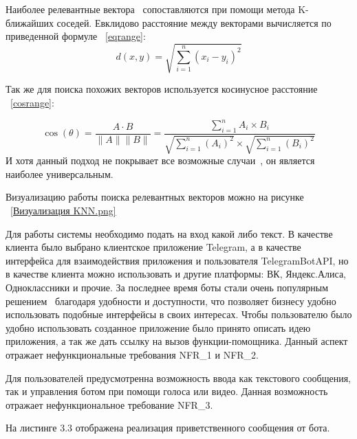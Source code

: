 
Наиболее релевантные вектора~\cite{vec} сопоставляются при помощи метода K-ближайших 
соседей. Евклидово расстояние между векторами вычисляется по приведенной формуле
~\ref{eqrange}:\\
\begin{equation} \label{eqrange}
    d(x,y)=\sqrt{\sum_{i=1}^{n}{(x_i-y_i)}^2}
\end{equation}

Так же для поиска похожих векторов используется косинусное расстояние
~\ref{cosrange}:

\begin{equation} \label{cosrange}
    \cos(\theta) = \frac{A \cdot B}{\| A\| \|B\|} = 
    \frac{\sum_{i=1}^{n}A_i \times B_i}{\sqrt{\sum_{i=1}^{n}(A_i)^2}
    \times \sqrt{\sum_{i=1}^{n}(B_i)^2}}
\end{equation}
И хотя данный подход не покрывает все возможные случаи~\cite{leven}, он
является наиболее универсальным.

Визуализацию работы поиска релевантных векторов можно на рисунке
~\ref{Визуализация KNN.png}


Для работы системы необходимо подать на вход какой либо текст.
В качестве клиента было выбрано клиентское приложение Telegram, а в качестве
интерфейса для взаимодействия приложения и пользователя TelegramBotAPI, но
в качестве клиента можно использовать и другие платформы: ВК, Яндекс.Алиса,
Одноклассники и прочие. За последнее время боты стали очень популярным
решением~\cite{bots} благодаря удобности и доступности, что позволяет
бизнесу удобно использовать подобные интерфейсы в своих интересах.
Чтобы пользователю было удобно использовать созданное приложение было
принято описать идею приложения, а так же дать ссылку на вызов
функции-помощника. Данный аспект отражает нефункциональные требования
NFR\_1 и NFR\_2.

Для пользователей предусмотренна возможность ввода как текстового сообщения,
так и управления ботом при помощи голоса или видео. Данная возможность
отражает нефункциональное требование NFR\_3.

На листинге 3.3 отображена реализация приветственного сообщения от бота.

